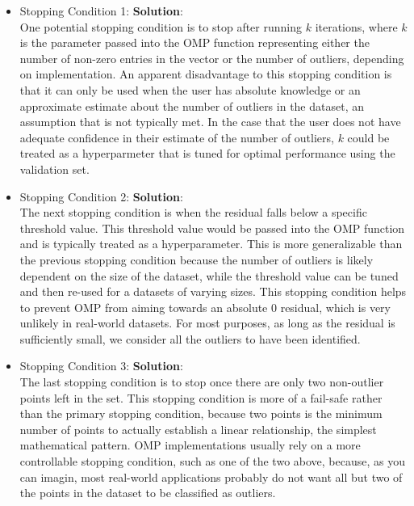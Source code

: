 \documentclass[11pt,letterpaper]{article}
\begin{document}
	\begin{itemize}
	\item Stopping Condition 1: \textbf{Solution}: \\
	 One potential stopping condition is to stop after running $k$ iterations, where $k$ is the parameter passed into the OMP function representing either the number of non-zero entries in the vector or the number of outliers, depending on implementation. An apparent disadvantage to this stopping condition is that it can only be used when the user has absolute knowledge or an approximate estimate about the number of outliers in the dataset, an assumption that is not typically met. In the case that the user does not have adequate confidence in their estimate of the number of outliers, $k$ could be treated as a hyperparmeter that is tuned for optimal performance using the validation set.
	\item Stopping Condition 2: \textbf{Solution}: \\
	 The next stopping condition is when the residual falls below a specific threshold value. This threshold value would be passed into the OMP function and is typically treated as a hyperparameter. This is more generalizable than the previous stopping condition because the number of outliers is likely dependent on the size of the dataset, while the threshold value can be tuned and then re-used for a datasets of varying sizes. This stopping condition helps to prevent OMP from aiming towards an absolute 0 residual, which is very unlikely in real-world datasets. For most purposes, as long as the residual is sufficiently small, we consider all the outliers to have been identified.
	\item Stopping Condition 3: \textbf{Solution}: \\
	The last stopping condition is to stop once there are only two non-outlier points left in the set. This stopping condition is more of a fail-safe rather than the primary stopping condition, because two points is the minimum number of points to actually establish a linear relationship, the simplest mathematical pattern. OMP implementations usually rely on a more controllable stopping condition, such as one of the two above, because, as you can imagin, most real-world applications probably do not want all but two of the points in the dataset to be classified as outliers.
	\end{itemize}
\end{document}
